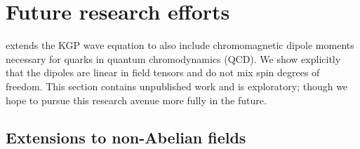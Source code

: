 \chapter{Future research efforts}
\label{sec:future}

 extends the KGP wave equation to also include chromomagnetic dipole moments necessary for quarks in quantum chromodynamics (QCD). We show explicitly that the dipoles are linear in field tensors and do not mix spin degrees of freedom. This section contains unpublished work and is exploratory; though we hope to pursue this research avenue more fully in the future.

\section{Extensions to non-Abelian fields}
\label{sec:quarks}


